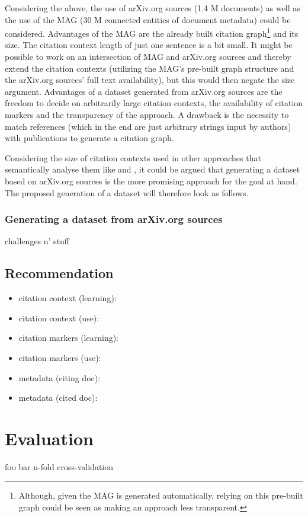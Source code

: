 \documentclass{proseminar}
\begin{document}
Considering the above, the use of arXiv.org sources (1.4 M documents) as well as the use of the MAG (30 M connected entities of document metadata) could be considered. Advantages of the MAG are the already built citation graph\footnote{Although, given the MAG is generated automatically, relying on this pre-built graph could be seen as making an approach less transparent.} and its size. The citation context length of just one sentence is a bit small. It might be possible to work on an intersection of MAG and arXiv.org sources and thereby extend the citation contexts (utilizing the MAG's pre-built graph structure and the arXiv.org sources' full text availability), but this would then negate the size argument. Advantages of a dataset generated from arXiv.org sources are the freedom to decide on arbitrarily large citation contexts, the availability of citation markers and the transparency of the approach. A drawback is the necessity to match references (which in the end are just arbitrary strings input by authors) with publications to generate a citation graph.

Considering the size of citation contexts used in other approaches that semantically analyse them like \cite{Duma2016} and \cite{Kobayashi2018}, it could be argued that generating a dataset based on arXiv.org sources is the more promising approach for the goal at hand. The proposed generation of a dataset will therefore look as follows.

\subsubsection{Generating a dataset from arXiv.org sources}
challenges n' stuff

\subsection{Recommendation}
\begin{itemize}
    \item citation context (learning):
    \item citation context (use):
    \item citation markers (learning):
    \item citation markers (use):
    \item metadata (citing doc):
    \item metadata (cited doc):
\end{itemize}

\section{Evaluation}
foo bar n-fold cross-validation
\end{document}
